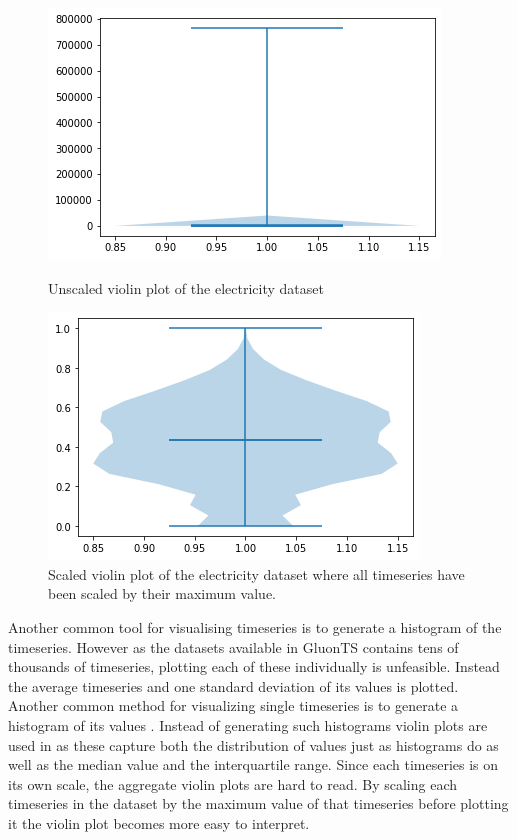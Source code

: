 \begin{figure}[htb]
  \centering
  \includegraphics[width=\linewidth]{./img/electricity_violin_unscaled.png}
  \caption{Unscaled violin plot of the electricity dataset}
  \label{fig:electricity_violin_unscaled}
  \endminipage\hfill
  \includegraphics[width=\linewidth]{./img/electricity_violin.png}
  \caption{Scaled violin plot of the electricity dataset where all timeseries have been scaled by their maximum value.}
  \label{fig:electricity_violin_scaled}
  \endminipage\hfill
\end{figure}

Another common tool for visualising timeseries is to generate a histogram of the timeseries. However as the datasets available in GluonTS contains tens of thousands of timeseries, plotting each of these individually is unfeasible. Instead the average timeseries and one standard deviation of its values is plotted. Another common method for visualizing single timeseries is to generate a histogram of its values \cite{hyndman_forecasting_3rd}. Instead of generating such histograms violin plots are used in as these capture both the distribution of values just as histograms do as well as the median value and the interquartile range. Since each timeseries is on its own scale, the aggregate violin plots are hard to read. By scaling each timeseries in the dataset by the maximum value of that timeseries before plotting it the violin plot becomes more easy to interpret.

